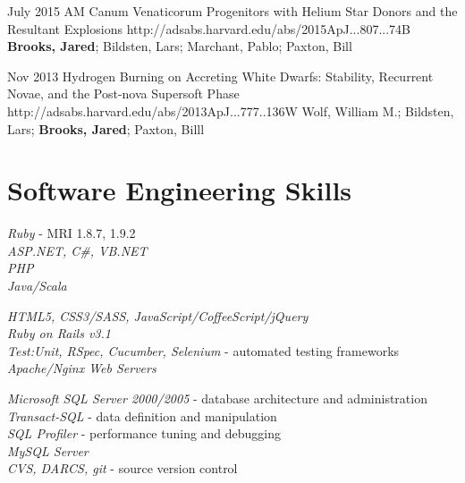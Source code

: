\documentclass[10pt]{article} %
\begin{document}

\joba
{July 2015}
{AM Canum Venaticorum Progenitors with Helium Star Donors and the Resultant Explosions}
{http://adsabs.harvard.edu/abs/2015ApJ...807...74B}
{\textbf{Brooks, Jared}; Bildsten, Lars; Marchant, Pablo; Paxton, Bill}


\jobb
{Nov 2013}
{Hydrogen Burning on Accreting White Dwarfs: Stability, Recurrent Novae, and the Post-nova Supersoft Phase}
{http://adsabs.harvard.edu/abs/2013ApJ...777..136W}
{Wolf, William M.; Bildsten, Lars; \textbf{Brooks, Jared}; Paxton, Billl}


\section{Software Engineering Skills}

{
\textit{Ruby} - MRI 1.8.7, 1.9.2\\
\textit{ASP.NET, C\#, VB.NET}\\
\textit{PHP}\\
\textit{Java/Scala}
}


{
\textit{HTML5, CSS3/SASS, JavaScript/CoffeeScript/jQuery}\\
\textit{Ruby on Rails v3.1}\\
\textit{Test:Unit, RSpec, Cucumber, Selenium} - automated testing frameworks\\
\textit{Apache/Nginx Web Servers}\\
}


{
\textit{Microsoft SQL Server 2000/2005} - database architecture and administration\\
\textit{Transact-SQL} - data definition and manipulation\\
\textit{SQL Profiler} - performance tuning and debugging\\
\textit{MySQL Server}\\
\textit{CVS, DARCS, git} - source version control
}
\end{document}

